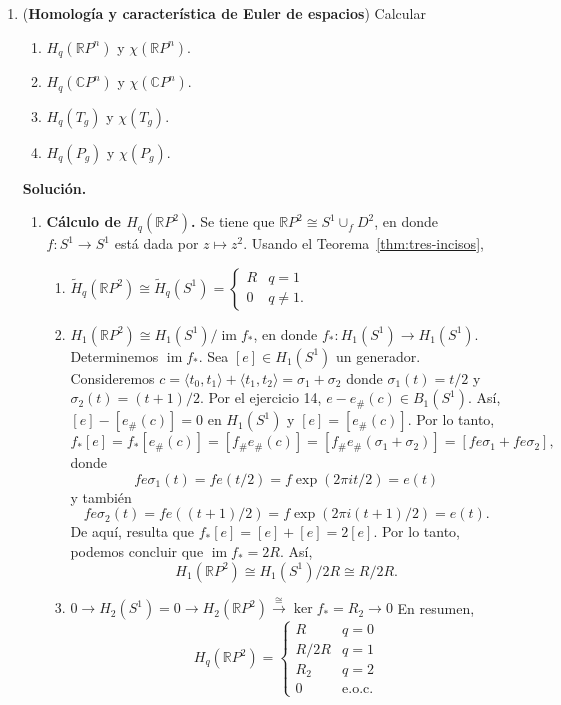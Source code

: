 \documentclass[11pt,a4paper]{article}
\theoremstyle{plain}
\theoremstyle{definition}
\theoremstyle{remark}
\newcommand{\RR}{\mathbb R}
\newcommand{\CC}{\mathbb C}
\DeclareMathOperator{\im}{im}
\begin{document}
\begin{enumerate}[label=\arabic*.,leftmargin=*]
\item (\textbf{Homología y característica de Euler de espacios}) Calcular
\begin{enumerate}[label=\alph*)]
\item $H_q(\RR P^n)$ y $\chi(\RR P^n)$.
\item $H_q(\CC P^n)$ y $\chi(\CC P^n)$.
\item $H_q(T_g)$ y $\chi(T_g)$.
\item $H_q(P_g)$ y $\chi(P_g)$.
\end{enumerate}

\noindent\textbf{Solución.}
\begin{enumerate}[label=\alph*)]
\item \textbf{Cálculo de $H_q(\RR P^2)$.} Se tiene que
$\RR P^2\cong S^1\cup_fD^2$, en donde $f:S^1\to S^1$ está dada por
$z\mapsto z^2$. Usando el Teorema~\ref{thm:tres-incisos},
\begin{enumerate}[label=\arabic*)]
\item $\tilde H_q(\RR P^2)\cong\tilde H_q(S^1)=\begin{cases}R & q=1\\0 & q\ne1.\end{cases}$
\item $H_1(\RR P^2)\cong H_1(S^1)/\im f_*$, en donde
$f_*:H_1(S^1)\to H_1(S^1)$. Determinemos $\im f_*$. Sea $[e]\in H_1(S^1)$
un generador. Consideremos $c=\langle t_0,t_1\rangle+\langle t_1,t_2\rangle=\sigma_1+\sigma_2$
donde $\sigma_1(t)=t/2$ y $\sigma_2(t)=(t+1)/2$. Por el ejercicio 14,
$e-e_\#(c)\in B_1(S^1)$. Así, $[e]-[e_\#(c)]=0$ en $H_1(S^1)$ y
$[e]=[e_\#(c)]$. Por lo tanto,
\[
f_*[e]=f_*[e_\#(c)]=[f_\#e_\#(c)]=[f_\#e_\#(\sigma_1+\sigma_2)]=[f e\sigma_1+f e\sigma_2],
\]
donde
\[
fe\sigma_1(t)=fe(t/2)=f\exp(2\pi it/2)=e(t)
\]
y también
\[
fe\sigma_2(t)=fe((t+1)/2)=f\exp(2\pi i(t+1)/2)=e(t).
\]
De aquí, resulta que $f_*[e]=[e]+[e]=2[e]$. Por lo tanto, podemos concluir
que $\im f_*=2R$. Así,
\[
H_1(\RR P^2)\cong H_1(S^1)/2R\cong R/2R.
\]
\item $0\to H_2(S^1)=0\to H_2(\RR P^2)\xrightarrow{\cong}\ker f_*=R_2\to0$
En resumen,
\[
H_q(\RR P^2)=\begin{cases}R & q=0\\ R/2R & q=1\\ R_2 & q=2\\0 & \text{e.o.c.}\end{cases}
\]
\end{enumerate}


\end{enumerate}
\end{enumerate}
\end{document}
